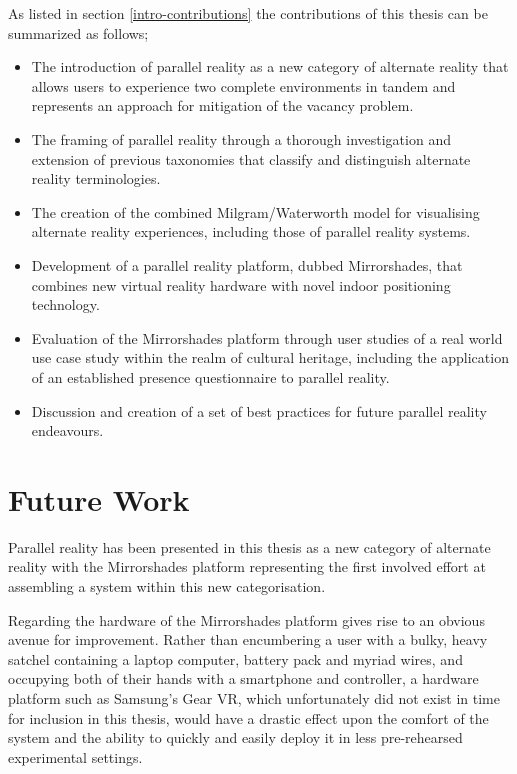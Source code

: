 As listed in section \ref{intro-contributions} the contributions of this thesis can be summarized as follows;

\begin{itemize}
	\item The introduction of parallel reality as a new category of alternate reality that allows users to experience two complete environments in tandem and represents an approach for mitigation of the vacancy problem.
	\item The framing of parallel reality through a thorough investigation and extension of previous taxonomies that classify and distinguish alternate reality terminologies.
	\item The creation of the combined Milgram/Waterworth model for visualising alternate reality experiences, including those of parallel reality systems.
	\item Development of a parallel reality platform, dubbed Mirrorshades, that combines new virtual reality hardware with novel indoor positioning technology.
	\item Evaluation of the Mirrorshades platform through user studies of a real world use case study within the realm of cultural heritage, including the application of an established presence questionnaire to parallel reality.
	\item Discussion and creation of a set of best practices for future parallel reality endeavours.
\end{itemize}


\section{Future Work}

Parallel reality has been presented in this thesis as a new category of alternate reality with the Mirrorshades platform representing the first involved effort at assembling a system within this new categorisation.

Regarding the hardware of the Mirrorshades platform gives rise to an obvious avenue for improvement. Rather than encumbering a user with a bulky, heavy satchel containing a laptop computer, battery pack and myriad wires, and occupying both of their hands with a smartphone and controller, a hardware platform such as Samsung's Gear VR, which unfortunately did not exist in time for inclusion in this thesis, would have a drastic effect upon the comfort of the system and the ability to quickly and easily deploy it in less pre-rehearsed experimental settings.

